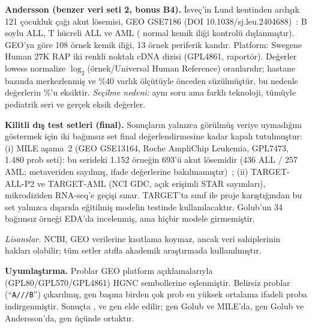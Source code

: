 \documentclass[conference]{IEEEtran}
\begin{document}
\textbf{Andersson (benzer veri seti 2, bonus B4).} İsveç'in Lund kentinden ardışık 121 çocukluk çağı
akut lösemisi, GEO GSE7186 (DOI 10.1038/sj.leu.2404688)~\cite{andersson2007}: \AndBALL{} B soylu ALL,
\AndTALL{} T hücreli ALL ve \AndAML{} AML (\AndExcluded{} normal kemik iliği kontrolü dışlanmıştır).
GEO'ya göre 108 örnek kemik iliği, 13 örnek periferik kandır. Platform: Swegene Human 27K RAP iki
renkli noktalı cDNA dizisi (GPL4861, \AndP{} raportör). Değerler lowess normalize
$\log_2$(örnek/Universal Human Reference) oranlarıdır; hastane bazında merkezlenmiş ve \%40 varlık
ölçütüyle önceden süzülmüştür, bu nedenle değerlerin \%\AndMissingPct'u eksiktir. \emph{Seçilme
nedeni:} aynı soru ama farklı teknoloji, tümüyle pediatrik seri ve gerçek eksik değerler.

\textbf{Kilitli dış test setleri (final).} Sonuçların yalnızca görülmüş veriye uymadığını göstermek
için iki bağımsız set final değerlendirmesine kadar kapalı tutulmuştur: (i) MILE aşama~2 (GEO GSE13164,
Roche AmpliChip Leukemia, GPL7473, 1.480 prob seti): bu serideki 1.152 örneğin 693'ü akut lösemidir
(436 ALL / 257 AML; metaveriden sayılmış, ifade değerlerine bakılmamıştır)~\cite{haferlach2010};
(ii) TARGET-ALL-P2 ve TARGET-AML (NCI GDC, açık erişimli STAR sayımları), mikrodiziden RNA-seq'e geçişi
sınar. TARGET'ta sınıf ile proje karıştığından bu set yalnızca dışarıda eğitilmiş modelin testinde
kullanılacaktır. Golub'un 34 bağımsız örneği EDA'da incelenmiş, ama hiçbir modele girmemiştir.

\emph{Lisanslar.} NCBI, GEO verilerine kısıtlama koymaz, ancak veri sahiplerinin hakları olabilir;
tüm setler atıfla akademik araştırmada kullanılmıştır.

\textbf{Uyumlaştırma.} Problar GEO platform açıklamalarıyla (GPL80/GPL570/GPL4861) HGNC sembollerine
eşlenmiştir. Belirsiz problar (``\texttt{A///B}'') çıkarılmış, gen başına birden çok prob en yüksek
ortalama ifadeli proba indirgenmiştir. Sonuçta \GenesGolub{}, \GenesMile{} ve \GenesAnd{} gen elde
edilir; \CommonGM{} gen Golub ve MILE'da, \CommonGA{} gen Golub ve Andersson'da, \CommonAll{} gen
üçünde ortaktır.
\end{document}
